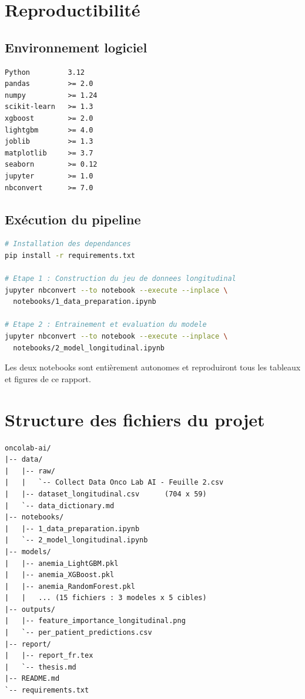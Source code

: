 \documentclass[12pt,a4paper]{report}
\begin{document}
\chapter{Reproductibilité}
\label{app:repro}

\section{Environnement logiciel}

\begin{lstlisting}
Python         3.12
pandas         >= 2.0
numpy          >= 1.24
scikit-learn   >= 1.3
xgboost        >= 2.0
lightgbm       >= 4.0
joblib         >= 1.3
matplotlib     >= 3.7
seaborn        >= 0.12
jupyter        >= 1.0
nbconvert      >= 7.0
\end{lstlisting}

\section{Exécution du pipeline}

\begin{lstlisting}[language=bash]
# Installation des dependances
pip install -r requirements.txt

# Etape 1 : Construction du jeu de donnees longitudinal
jupyter nbconvert --to notebook --execute --inplace \
  notebooks/1_data_preparation.ipynb

# Etape 2 : Entrainement et evaluation du modele
jupyter nbconvert --to notebook --execute --inplace \
  notebooks/2_model_longitudinal.ipynb
\end{lstlisting}

Les deux notebooks sont entièrement autonomes et reproduiront tous les tableaux et figures de ce rapport.

\chapter{Structure des fichiers du projet}
\label{app:files}

\begin{lstlisting}
oncolab-ai/
|-- data/
|   |-- raw/
|   |   `-- Collect Data Onco Lab AI - Feuille 2.csv
|   |-- dataset_longitudinal.csv      (704 x 59)
|   `-- data_dictionary.md
|-- notebooks/
|   |-- 1_data_preparation.ipynb
|   `-- 2_model_longitudinal.ipynb
|-- models/
|   |-- anemia_LightGBM.pkl
|   |-- anemia_XGBoost.pkl
|   |-- anemia_RandomForest.pkl
|   |   ... (15 fichiers : 3 modeles x 5 cibles)
|-- outputs/
|   |-- feature_importance_longitudinal.png
|   `-- per_patient_predictions.csv
|-- report/
|   |-- report_fr.tex
|   `-- thesis.md
|-- README.md
`-- requirements.txt
\end{lstlisting}
\end{document}
